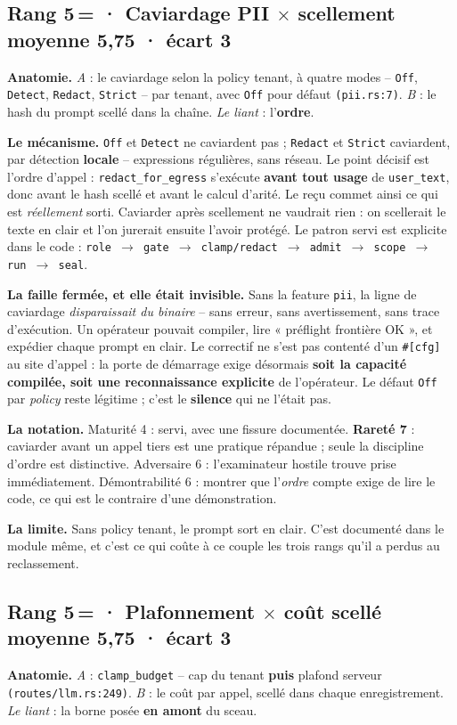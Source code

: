 \documentclass[10pt]{article}
\newcommand{\pire}[1]{{\color{red}\textbf{#1}}}
\newcommand{\sz}[1]{{\small\color{grey}\textsf{#1}}}
\newcommand{\code}[1]{\texttt{\small #1}}
\newcommand{\x}{$\times$}
\newcommand{\loc}[1]{{\footnotesize\color{grey}\texttt{#1}}}
\newcommand{\couple}[4]{%
  \subsection{#1 · #2 \hfill {\normalsize\color{grey}moyenne \textbf{#3} · écart #4}}}
\begin{document}
\couple{Rang 5\,=}{Caviardage PII \x{} scellement}{5,75}{3}

\textbf{Anatomie.} \emph{A} : le caviardage selon la policy tenant, à quatre modes -- \code{Off},
\code{Detect}, \code{Redact}, \code{Strict} -- par tenant, avec \code{Off} pour défaut
\loc{(pii.rs:7)}. \emph{B} : le hash du prompt scellé dans la chaîne. \emph{Le liant} :
l'\textbf{ordre}.

\textbf{Le mécanisme.} \code{Off} et \code{Detect} ne caviardent pas ; \code{Redact} et \code{Strict}
caviardent, par détection \textbf{locale} -- expressions régulières, sans réseau. Le point décisif est
l'ordre d'appel : \code{redact\_for\_egress} s'exécute \textbf{avant tout usage} de \code{user\_text},
donc avant le hash scellé et avant le calcul d'arité. Le reçu commet ainsi ce qui est \emph{réellement}
sorti. Caviarder après scellement ne vaudrait rien : on scellerait le texte en clair et l'on jurerait
ensuite l'avoir protégé. Le patron servi est explicite dans le code :
\code{role $\rightarrow$ gate $\rightarrow$ clamp/redact $\rightarrow$ admit $\rightarrow$ scope
$\rightarrow$ run $\rightarrow$ seal}.

\textbf{La faille fermée, et elle était invisible.} Sans la feature \code{pii}, la ligne de caviardage
\emph{disparaissait du binaire} -- sans erreur, sans avertissement, sans trace d'exécution. Un
opérateur pouvait compiler, lire « préflight frontière OK », et expédier chaque prompt en clair. Le
correctif ne s'est pas contenté d'un \code{\#[cfg]} au site d'appel : la porte de démarrage exige
désormais \textbf{soit la capacité compilée, soit une reconnaissance explicite} de l'opérateur. Le
défaut \code{Off} par \emph{policy} reste légitime ; c'est le \textbf{silence} qui ne l'était pas.

\textbf{La notation.} \sz{Maturité 4} : servi, avec une fissure documentée. \pire{Rareté 7} :
caviarder avant un appel tiers est une pratique répandue ; seule la discipline d'ordre est
distinctive. \sz{Adversaire 6} : l'examinateur hostile trouve prise immédiatement. \sz{Démontrabilité
6} : montrer que l'\emph{ordre} compte exige de lire le code, ce qui est le contraire d'une
démonstration.

\textbf{La limite.} Sans policy tenant, le prompt sort en clair. C'est documenté dans le module même,
et c'est ce qui coûte à ce couple les trois rangs qu'il a perdus au reclassement.

\couple{Rang 5\,=}{Plafonnement \x{} coût scellé}{5,75}{3}

\textbf{Anatomie.} \emph{A} : \code{clamp\_budget} -- cap du tenant \textbf{puis} plafond serveur
\loc{(routes/llm.rs:249)}. \emph{B} : le coût par appel, scellé dans chaque enregistrement. \emph{Le
liant} : la borne posée \textbf{en amont} du sceau.
\end{document}
